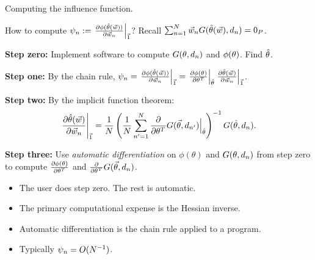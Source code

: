\begin{frame}{Computing the influence function.}

How to compute
$\psi_n := \left.\frac{\partial \phi(\hat{\theta}(\vec{w}))}{\partial \vec{w}_n}\right|_{\vec{1}}$?
%
Recall $\sum_{n=1}^N \vec{w}_{n} G(\hat{\theta}(\vec{w}), d_{n}) =  0_{P}$.

\textbf{Step zero:}
Implement software to compute $G(\theta, d_{n})$ and
$\phi(\theta)$. Find $\hat{\theta}$.

\textbf{Step one:}
By the chain rule,
$\psi_n = \left.\frac{\partial \phi(\hat{\theta}(\vec{w}))}{\partial \vec{w}_n}\right|_{\vec{1}}
= \left.\frac{\partial \phi(\theta)}{\partial \theta^T}\right|_{\hat{\theta}}
  \left.\frac{\partial \hat{\theta}(\vec{w})}{\partial \vec{w}_n}\right|_{\vec{1}}$.

\textbf{Step two:}
By the implicit function theorem:
%
\begin{align*}
%
\fracat{\partial \thetahat(\w)}{\partial \w_n}{\onevec} ={}
\frac{1}{N}
\left(
  \frac{1}{N}
  \sum_{n'=1}^N
    \frac{\partial}{\partial \theta^T} G(\vec\theta, \d_{n'})
        \Big\vert_{\thetahat}
\right)^{-1} G(\thetahat, \d_{n}).
%
\end{align*}
%

\textbf{Step three:}
%
Use \textit{automatic differentiation} on $\phi(\theta)$ and $G(\theta, d_{n})$
from step zero to compute $\frac{\partial \phi(\theta)}{\partial \theta^T}$
and $\frac{\partial}{\partial \theta^T} G(\vec\theta, d_{n})$.

\hrulefill

\begin{itemize}
    \item The user does step zero.  The rest is automatic.
    \item The primary computational expense is the Hessian inverse.
    \item Automatic differentiation is the chain rule applied to a program.
    \item Typically $\psi_n = O(N^{-1})$.
\end{itemize}



%
%


\end{frame}
